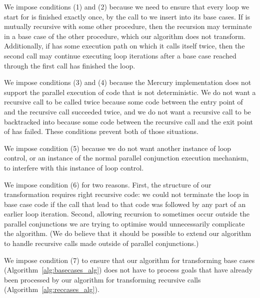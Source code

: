 We impose conditions (1) and (2) because we need to ensure
that every loop we start for  is finished exactly once,
by the call to \lcfinish we insert into its base cases.
If  is mutually recursive with some other procedure,
then the recursion may terminate in a base case of the other procedure,
which our algorithm does not transform.
Additionally, if  has some execution path on which it calls
itself twice,
then the second call may continue executing loop iterations
after a base case reached through the first call has finished the loop.

We impose conditions (3) and (4) because the Mercury implementation
does not support the parallel execution of code that is not deterministic.
We do not want a recursive call to be called twice because
some code between the entry point of  and the recursive call
succeeded twice,
and we do not want a recursive call to be backtracked into because
some code between the recursive call and the exit point of 
has failed.
These conditions prevent both of those situations.

We impose condition (5) because we do not want another instance of loop control,
or an instance of the normal parallel conjunction execution mechanism,
to interfere with this instance of loop control.

We impose condition (6) for two reasons.
First, the structure of our transformation requires right recursive code:
we could not terminate the loop in base case code
if the call that lead to that code
was followed by any part of an earlier loop iteration.
Second, allowing recursion to sometimes occur
outside the parallel conjunctions we are trying to optimise
would unnecessarily complicate the algorithm.
(We do believe that it should be possible to extend our algorithm
to handle recursive calls made outside of parallel conjunctions.)


We impose condition (7) to ensure that
our algorithm for transforming base cases
(Algorithm~\ref{alg:basecases_alg})
does not have to process goals that have already been processed
by our algorithm for transforming recursive calls
(Algorithm~\ref{alg:reccases_alg}).


